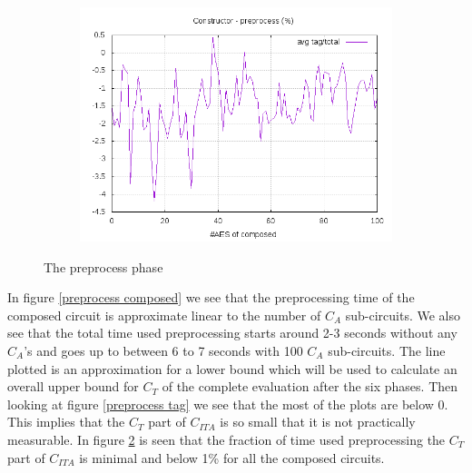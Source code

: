 \documentclass[10pt,a4paper]{article}
\begin{document}
\begin{figure}[h]
\begin{subfigure}[t]{0.3\textwidth}
        \includegraphics[width=\textwidth]{const_preprocess_frac}
        \caption{}
        \label{preprocess frac}
    \end{subfigure}
    \caption{The preprocess phase}
\end{figure}

In figure \ref{preprocess composed} we see that the preprocessing time of the composed circuit is approximate linear to the number of $C_A$ sub-circuits. We also see that the total time used preprocessing starts around 2-3 seconds without any $C_A$'s and goes up to between 6 to 7 seconds with 100 $C_A$ sub-circuits. The line plotted is an approximation for a lower bound which will be used to calculate an overall upper bound for $C_T$ of the complete evaluation after the six phases. 
Then looking at figure \ref{preprocess tag} we see that the most of the plots are below 0. This implies that the $C_T$ part of $C_{ITA}$ is so small that it is not practically measurable. 
In figure \ref{preprocess frac} is seen that the fraction of time used preprocessing the $C_T$ part of $C_{ITA}$ is minimal and below 1\% for all the composed circuits.
\end{document}
